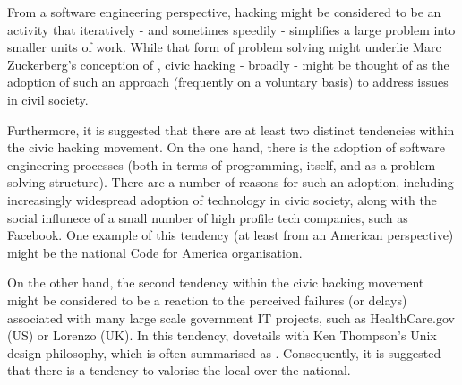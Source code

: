 From a software engineering perspective, hacking might be considered to be an activity that iteratively - and sometimes speedily - simplifies a large problem into smaller units of work.
While that form of problem solving might underlie Marc Zuckerberg's \cite{mark-zuckerberg} conception of ,
civic hacking - broadly - might be thought of as the adoption of such an approach (frequently on a voluntary basis) to address issues in civil society.

Furthermore, it is suggested that there are at least two distinct tendencies within the civic hacking movement.
On the one hand, there is the adoption of software engineering processes (both in terms of programming, itself, and as a problem solving structure). 
There are a number of reasons for such an adoption,
including increasingly widespread adoption of technology in civic society,
along with the social influnece of a small number of high profile tech companies, such as Facebook. 
One example of this tendency (at least from an American perspective) might be the national Code for America \cite{code-for-america} organisation.

On the other hand, the second tendency within the civic hacking movement might be considered to be a reaction to the perceived failures (or delays) associated with many large scale government IT projects, such as HealthCare.gov \cite{health-care-gov} (US) or Lorenzo \cite{lorenzo} (UK).
In this tendency,   dovetails with Ken Thompson's \cite{ken-thompson} Unix design philosophy, which is often summarised as .
Consequently, it is suggested that there is a tendency to valorise the local over the national.

